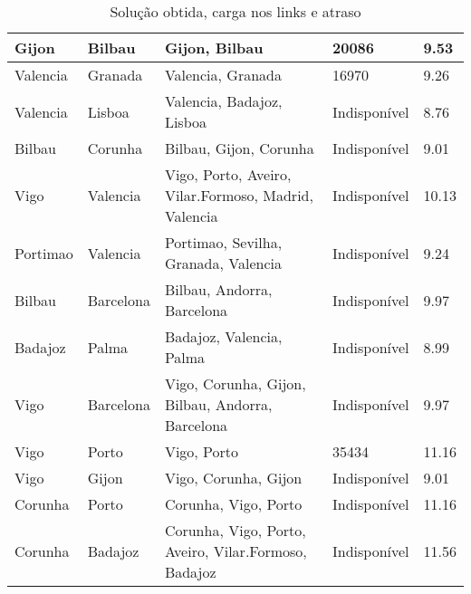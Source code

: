 \begin{table}[!htb]
{\begin{tabular}{|l|l|l|l|l|}
Gijon & Bilbau & Gijon, Bilbau & 20086 & 9.53 \\ \hline
Valencia & Granada & Valencia, Granada & 16970 & 9.26 \\ \hline
Valencia & Lisboa & Valencia, Badajoz, Lisboa & Indisponível & 8.76 \\ \hline
Bilbau & Corunha & Bilbau, Gijon, Corunha & Indisponível & 9.01 \\ \hline
Vigo & Valencia & Vigo, Porto, Aveiro, Vilar.Formoso, Madrid, Valencia & Indisponível & 10.13 \\ \hline
Portimao & Valencia & Portimao, Sevilha, Granada, Valencia & Indisponível & 9.24 \\ \hline
Bilbau & Barcelona & Bilbau, Andorra, Barcelona & Indisponível & 9.97 \\ \hline
Badajoz & Palma & Badajoz, Valencia, Palma & Indisponível & 8.99 \\ \hline
Vigo & Barcelona & Vigo, Corunha, Gijon, Bilbau, Andorra, Barcelona & Indisponível & 9.97 \\ \hline
Vigo & Porto & Vigo, Porto & 35434 & 11.16 \\ \hline
Vigo & Gijon & Vigo, Corunha, Gijon & Indisponível & 9.01 \\ \hline
Corunha & Porto & Corunha, Vigo, Porto & Indisponível & 11.16 \\ \hline
Corunha & Badajoz & Corunha, Vigo, Porto, Aveiro, Vilar.Formoso, Badajoz & Indisponível & 11.56 \\ \hline
\end{tabular}}
\caption[]{Solução obtida, carga nos links e atraso}
\end{table}

